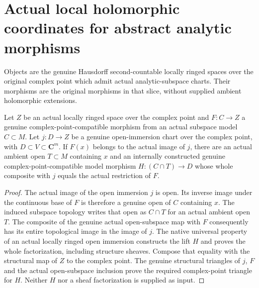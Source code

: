 \section{Actual local holomorphic coordinates for abstract analytic morphisms}

Objects are the genuine Hausdorff second-countable locally ringed spaces
over the original complex point which admit actual analytic-subspace charts.
Their morphisms are the original morphisms in that slice, without supplied
ambient holomorphic extensions.

\begin{theorem}
\label{hir:reduced-analytic-morphism-local-chart-factor}
\leanok
Let $Z$ be an actual locally ringed space over the complex point and
$F:C\to Z$ a genuine complex-point-compatible morphism from an actual
subspace model $C\subset M$. Let $j:D\to Z$ be a genuine open-immersion
chart over the complex point, with $D\subset V\subset\mathbf C^m$.
If $F(x)$ belongs to the actual image of $j$, there are an actual ambient
open $T\subset M$ containing $x$ and an internally constructed genuine
complex-point-compatible model morphism $H:(C\cap T)\to D$ whose whole
composite with $j$ equals the actual restriction of $F$.
\end{theorem}
\begin{proof}
The actual image of the open immersion $j$ is open. Its inverse image
under the continuous base of $F$ is therefore a genuine open of $C$
containing $x$. The induced subspace topology writes that open as $C\cap T$
for an actual ambient open $T$. The composite of the genuine actual
open-subspace map with $F$ consequently has its entire topological image
in the image of $j$. The native universal property of an actual locally
ringed open immersion constructs the lift $H$ and proves the whole
factorization, including structure sheaves. Compose that equality with
the structural map of $Z$ to the complex point. The genuine structural
triangles of $j$, $F$ and the actual open-subspace inclusion prove the
required complex-point triangle for $H$. Neither $H$ nor a sheaf
factorization is supplied as input.
\end{proof}

